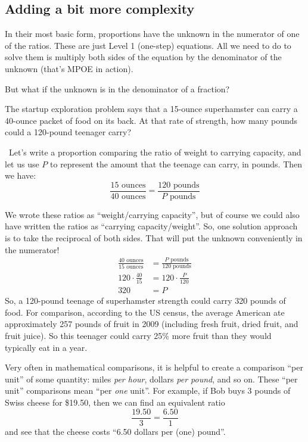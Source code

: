 \subsection{Adding a bit more complexity}

In their most basic form, proportions have the unknown in the numerator of one of the ratios. These are just Level 1 (one-step) equations. All we need to do to solve them is multiply both sides of the equation by the denominator of the unknown (that's MPOE in action).

But what if the unknown is in the denominator of a fraction?

\begin{boxex}
The startup exploration problem says that a 15-ounce superhamster can carry a 40-ounce packet of food on its back. At that rate of strength, how many pounds could a 120-pound teenager carry?

\exsoln\ Let's write a proportion comparing the ratio of weight to carrying capacity, and let us use $P$ to represent the amount that the teenage can carry, in pounds. Then we have: \[\frac{15 \text{ ounces}}{40 \text{ ounces}} = \frac{120 \text{ pounds}}{P \text{ pounds}}\]

We wrote these ratios as ``weight/carrying capacity'', but of course we could also  have written the ratios as ``carrying capacity/weight''. So, one solution approach is to take the reciprocal of both sides. That will put the unknown conveniently in the numerator!
\[\begin{aligned}
\frac{40 \text{ ounces}}{15 \text{ ounces}} &= \frac{P \text{ pounds}}{120 \text{ pounds}}
\\[2ex]
120\cdot\frac{40}{15} &= 120\cdot\frac{P}{120}
\\[2ex]
320 &= P
\end{aligned}\]
So, a 120-pound teenage of superhamster strength could carry 320 pounds of food. For comparison, according to the US census, the average American ate approximately 257 pounds of fruit in 2009 (including fresh fruit, dried fruit, and fruit juice). So this teenager could carry 25\% more fruit than they would typically eat in a year.
\end{boxex}

Very often in mathematical comparisons, it is helpful to create a comparison ``per unit'' of some quantity: miles \textit{per hour}, dollars \textit{per pound}, and so on. These ``per unit'' comparisons mean ``per \textit{one} unit''. For example, if Bob buys 3 pounds of Swiss cheese for \$19.50, then we can find an equivalent ratio \[\frac{19.50}{3} = \frac{6.50}{1}\] and see that the cheese costs ``6.50 dollars per (one) pound''.


